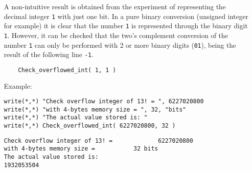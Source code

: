 A non-intuitive result is obtained from the experiment of representing the decimal integer \texttt{1} with just one bit. 
In a pure binary conversion (unsigned integer for example) it is clear that the number \texttt{1} is represented through 
the binary digit \texttt{1}. However, it can be checked that the two's complement conversion of the number \texttt{1} can only be 
performed with 2 or more binary digits (\texttt{01}), being the result of the following line \texttt{-1}.

\begin{verbatim}
    Check_overflowed_int( 1, 1 )
\end{verbatim}


Example:

\begin{verbatim} 
write(*,*) "Check overflow integer of 13! = ", 6227020800
write(*,*) "with 4-bytes memory size = ", 32, "bits"
write(*,*) "The actual value stored is: "
write(*,*) Check_overflowed_int( 6227020800, 32 )
\end{verbatim} 

\begin{verbatim} 
Check overflow integer of 13! =             6227020800
with 4-bytes memory size =           32 bits
The actual value stored is:
1932053504
\end{verbatim} 




